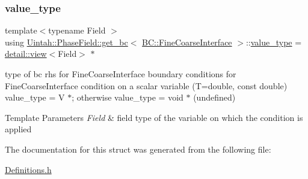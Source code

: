 \subsubsection{\texorpdfstring{value\+\_\+type}{value\_type}}
{\footnotesize\ttfamily template$<$typename Field $>$ \\
using \hyperlink{structUintah_1_1PhaseField_1_1get__bc}{Uintah\+::\+Phase\+Field\+::get\+\_\+bc}$<$ \hyperlink{namespaceUintah_1_1PhaseField_a148fba372aa3be96fd6eede7a2fa10b5ad2d89be9637ff8b537fa4b6026c0e574}{B\+C\+::\+Fine\+Coarse\+Interface} $>$\+::\hyperlink{structUintah_1_1PhaseField_1_1get__bc_3_01BC_1_1FineCoarseInterface_01_4_a65c14de3908bed624a90d1d2c3ad2b84}{value\+\_\+type} =  \hyperlink{classUintah_1_1PhaseField_1_1detail_1_1view}{detail\+::view}$<$Field$>$ $\ast$}



type of bc rhs for Fine\+Coarse\+Interface boundary conditions for Fine\+Coarse\+Interface condition on a scalar variable (T=double, const double) value\+\_\+type = V $\ast$; otherwise value\+\_\+type = void $\ast$ (undefined) 


\begin{DoxyTemplParams}{Template Parameters}
{\em Field} & field type of the variable on which the condition is applied \\
\hline
\end{DoxyTemplParams}


The documentation for this struct was generated from the following file\+:\begin{DoxyCompactItemize}
\item 
\hyperlink{Definitions_8h}{Definitions.\+h}\end{DoxyCompactItemize}
